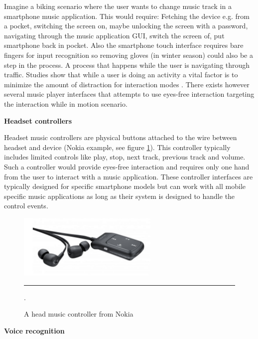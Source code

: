 Imagine a biking scenario where the user wants to change music track in a smartphone music application. This would require: Fetching the device e.g. from a pocket, switching the screen on, maybe unlocking the screen with a password, navigating through the music application GUI, switch the screen of, put smartphone back in pocket. Also the smartphone touch interface requires bare fingers for input recognition so removing gloves (in winter season) could also be a step in the process. A process that happens while the user is navigating through traffic. Studies show that while a user is doing an activity a vital factor is to minimize the amount of distraction for interaction modes \cite{pascoe_using_2000}. There exists however several music player interfaces that attempts to use eyes-free interaction targeting the interaction while in motion scenario.

\textbf{Headset controllers}

Headset music controllers are physical buttons attached to the wire between headset and device (Nokia example, see figure \ref{fig:nokia}). This controller typically includes limited controls like play, stop, next track, previous track and volume. Such a controller would provide eyes-free interaction and requires only one hand from the user to interact with a music application. These controller interfaces are typically designed for specific smartphone models but can work with all mobile specific music applications as long as their system is designed to handle the control events.

\begin{figure}[t]
	\centering
		\includegraphics[width=0.6\textwidth,height=\textheight,keepaspectratio]{./Figures/nokia-headset.png}
		\rule{35em}{0.5pt}
	\caption[Nokia music headset]{A head music controller from Nokia\footnotemark}.
	\label{fig:nokia}
\end{figure}


\textbf{Voice recognition}

